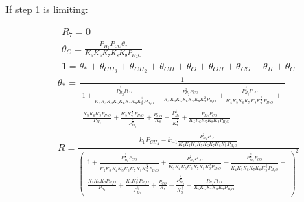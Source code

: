 \documentclass{article}
\begin{document}
If step 1 is limiting:

\begin{eqnarray}
    R_{7} = 0  \\
    \theta_{C}= \frac{P_{H_2} P_{CO} \theta_{*}}{K_{5} K_{6} K_{7} K_{8} K_{9} P_{H_{2}O}} \nonumber  \\
    1 = \theta_{*}+\theta_{CH_{3}}+\theta_{CH_{2}}+\theta_{CH}+\theta_{O}+\theta_{OH}+\theta_{CO}+\theta_{H}+\theta_{C}
\end{eqnarray}
\begin{eqnarray}
    \theta_* = \frac{1}
    {
    \begin{multlined}
    1 + \frac{P_{H_2}^{\frac{5}{2}} P_{CO}}{K_{2} K_{3} K_{4} K_{5} K_{6} K_{7} K_{8} K_{9}^{\frac{5}{2}} P_{H_{2}O}} + \frac{P_{H_2}^2 P_{CO}}{K_{3} K_{4} K_{5} K_{6} K_{7} K_{8} K_{9}^2 P_{H_{2}O}} + \frac{P_{H_2}^{\frac{3}{2}} P_{CO}}{K_{4} K_{5} K_{6} K_{7} K_{8} K_{9}^{\frac{3}{2}} P_{H_{2}O}} + \\ \frac{K_{5} K_{6} K_{9} P_{H_{2}O}}{P_{H_2}} + \frac{K_{5} K_{9}^{\frac{1}{2}} P_{H_{2}O}}{P_{H_2}^\frac{1}{2}} +  \frac{P_{CO}}{K_{8}} + \frac{P_{H_2}^{\frac{1}{2}}}{K_{9}^\frac{1}{2}} + \frac{P_{H_2} P_{CO}}{K_{5} K_{6} K_{7} K_{8} K_{9} P_{H_{2}O}}
    \end{multlined}
    }  \\
    R = \frac{ k_{1}P_{CH_{4}} - k_{-1} \frac{P_{H_2}^{3} P_{CO}}{K_{2} K_{3} K_{4} K_{5} K_{6} K_{7} K_{8} K_{9}^{3} P_{H_{2}O}} }  
    {\left({
    \begin{multlined}
     1 + \frac{P_{H_2}^{\frac{5}{2}} P_{CO}}{K_{2} K_{3} K_{4} K_{5} K_{6} K_{7} K_{8} K_{9}^{\frac{5}{2}} P_{H_{2}O}} + \frac{P_{H_2}^2 P_{CO}}{K_{3} K_{4} K_{5} K_{6} K_{7} K_{8} K_{9}^2 P_{H_{2}O}} + \frac{P_{H_2}^{\frac{3}{2}} P_{CO}}{K_{4} K_{5} K_{6} K_{7} K_{8} K_{9}^{\frac{3}{2}} P_{H_{2}O}} + \\
    \frac{K_{5} K_{6} K_{9} P_{H_{2}O}}{P_{H_2}} + \frac{K_{5} K_{9}^{\frac{1}{2}} P_{H_{2}O}}{P_{H_2}^\frac{1}{2}} + \frac{P_{CO}}{K_{8}} + \frac{P_{H_2}^{\frac{1}{2}}}{K_{9}^\frac{1}{2}} + \frac{P_{H_2} P_{CO}}{K_{5} K_{6} K_{7} K_{8} K_{9} P_{H_{2}O}} 
    \end{multlined}
    }\right) ^2} 
\end{eqnarray}
\end{document}
